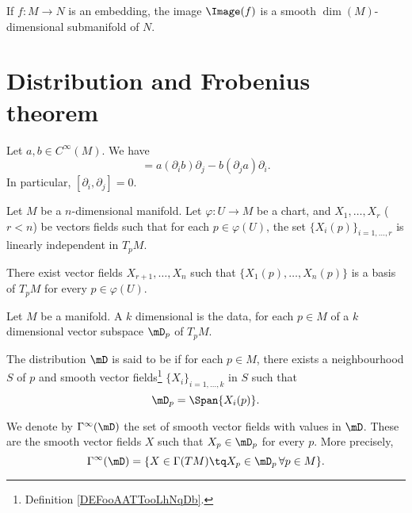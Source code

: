 \begin{proposition}     \label{PROPooYHOKooYASzRL}
	If \( f\colon M\to N\) is an embedding, the image \( \Image(f)\) is a smooth \( \dim(M)\)-dimensional submanifold of \( N\).
\end{proposition}


\section{Distribution and Frobenius theorem}

\begin{lemma}       \label{LEMooQXRSooHDRequ}
	Let \( a,b\in  C^{\infty}(M)\). We have
	\begin{equation}
		[a\partial_i,b\partial_j]=a(\partial_ib)\partial_j-b(\partial_ja)\partial_i.
	\end{equation}
	In particular, \( [\partial_i,\partial_j]=0\).
\end{lemma}

\begin{lemma}       \label{LEMooGHQZooMIWAfn}
	Let \( M\) be a \( n\)-dimensional manifold. Let \( \varphi\colon U\to M\) be a chart, and \( X_1,\ldots, X_r\) (\( r<n\)) be vectors fields such that for each \( p\in \varphi(U)\), the set \( \{ X_i(p) \}_{i=1,\ldots, r}\) is linearly independent in \( T_pM\).

	There exist vector fields \( X_{r+1},\ldots,  X_n\) such that \( \{  X_1(p),\ldots, X_n(p) \}\) is a basis of \( T_pM\) for every \( p\in \varphi(U)\).
\end{lemma}

\begin{definition}      \label{DEFooYOMHooZJvsSt}
	Let \( M\) be a manifold. A \( k\) dimensional  is the data, for each \( p\in M\) of a \( k\) dimensional vector subspace \( \mD_p\) of \( T_pM\).

	The distribution \( \mD\) is said to be  if for each \( p\in M\), there exists a neighbourhood \( S\) of \( p\) and smooth vector fields\footnote{Definition \ref{DEFooAATTooLhNqDb}.} \( \{ X_i \}_{i=1,\ldots, k}\) in \( S\) such that
	\begin{equation}
		\mD_p=\Span\{ X_i(p) \}.
	\end{equation}

	We denote by \( \Gamma^{\infty}(\mD) \) the set of smooth vector fields with values in \( \mD\). These are the smooth vector fields \( X\) such that \( X_p\in \mD_p\) for every \( p\). More precisely,
	\begin{equation}
		\Gamma^{\infty}(\mD)=\{ X\in \Gamma(TM)\tq X_p\in\mD_p\,\forall p\in M \}.
	\end{equation}
\end{definition}

